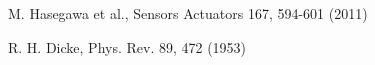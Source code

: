 \documentclass[a4paper,11pt]{article}
\begin{document}






\begin{thebibliography}{9}
	
	M. Hasegawa et al., Sensors Actuators 167, 594-601 (2011)
	
	R. H. Dicke, Phys. Rev. 89, 472 (1953)
	
\end{thebibliography}
\end{document}

